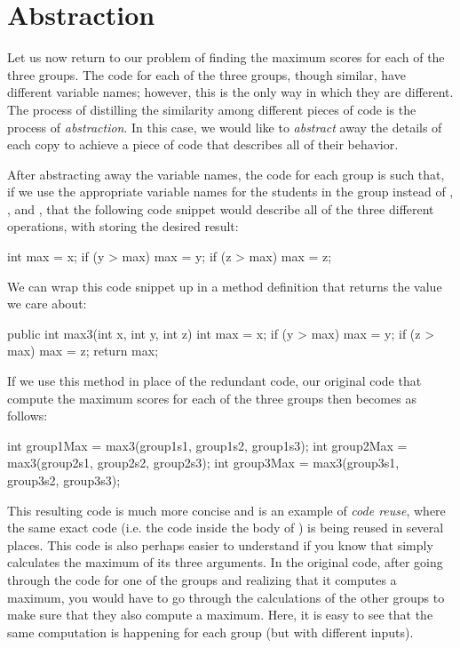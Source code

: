 \section{Abstraction}\label{sec:abstraction}
Let us now return to our problem of finding the maximum scores for each
of the three groups.
The code for each of the three groups, though similar, have different variable names;
however, this is the only way in which they are different.
The process of distilling the similarity among different pieces of code is
the process of \emph{abstraction}.
In this case, we would like to \emph{abstract} away the details of
each copy to achieve a piece of code that describes all of their behavior.

After abstracting away the variable names, the code for each group is such that,
if we use the appropriate variable names for the students in the group
instead of , , and , that the following code snippet
would describe all of the three different operations, with
 storing the desired result:
\begin{code}
int max = x;
if (y > max) {
  max = y; 
}
if (z > max) {
  max = z;
}
\end{code}
We can wrap this code snippet up in a method definition
that returns the value we care about:
\begin{code}
public int max3(int x, int y, int z) {
  int max = x;
  if (y > max) {
    max = y;
  }
  if (z > max) {
    max = z;
  }
  return max;
}
\end{code}

If we use this method in place of the redundant code,
our original code that compute the maximum scores for each of the three
groups then becomes as follows:
\begin{code}
int group1Max = max3(group1s1, group1s2, group1s3);
int group2Max = max3(group2s1, group2s2, group2s3);
int group3Max = max3(group3s1, group3s2, group3s3);
\end{code}
This resulting code is much more concise and is an example
of \emph{code reuse}, where the same exact code
(i.e. the code inside the body of ) is being reused
in several places. This code is also perhaps easier to understand
if you know that  simply calculates the maximum
of its three arguments. In the original code, after
going through the code for one of the groups
and realizing that it computes a maximum, you
would have to go through the calculations of the other
groups to make sure that they also compute a maximum.
Here, it is easy to see that the same computation is happening
for each group (but with different inputs).

